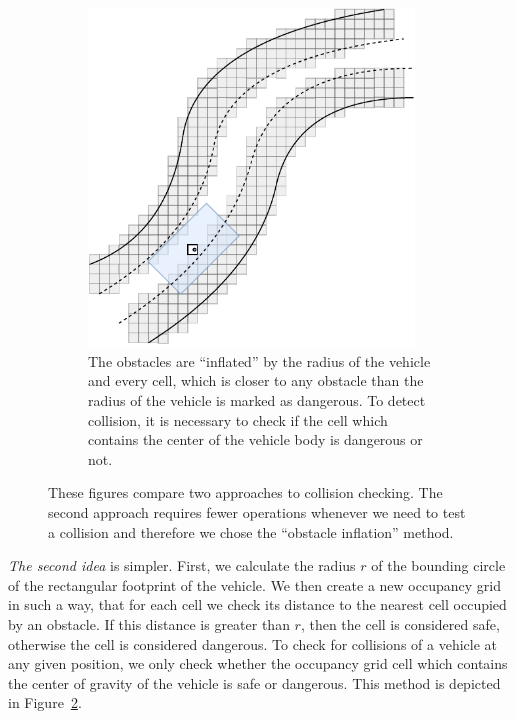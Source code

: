 \begin{figure}[!tbp]
\begin{subfigure}[t]{0.45\textwidth}
		\includegraphics[width=0.95\textwidth]{../img/obstacle_inflation}
		\caption{The obstacles are ``inflated'' by the radius of the vehicle and every cell, which is closer to any obstacle than the radius of the vehicle is marked as dangerous. To detect collision, it is necessary to check if the cell which contains the center of the vehicle body is dangerous or not.}
		\label{fig:collision_detection_inflation}
	\end{subfigure}
	
	\caption{These figures compare two approaches to collision checking. The second approach requires fewer operations whenever we need to test a collision and therefore we chose the ``obstacle inflation'' method.}
\end{figure}

\textit{The second idea} is simpler. First, we calculate the radius $r$ of the bounding circle of the rectangular footprint of the vehicle. We then create a new occupancy grid in such a way, that for each cell we check its distance to the nearest cell occupied by an obstacle. If this distance is greater than $r$, then the cell is considered safe, otherwise the cell is considered dangerous. To check for collisions of a vehicle at any given position, we only check whether the occupancy grid cell which contains the center of gravity of the vehicle is safe or dangerous. This method is depicted in Figure~\ref{fig:collision_detection_inflation}.

